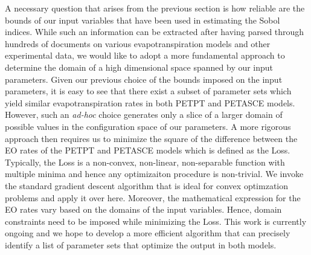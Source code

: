 \documentclass{article}
\begin{document}
A necessary question that arises from the previous section is how reliable are
the bounds of our input variables that have been used in estimating the Sobol
indices. While such an
information can be extracted after having parsed through hundreds of documents on
various evapotranspiration models and other experimental data, we would like to
adopt a more fundamental approach to determine the domain of a high
dimensional space spanned by our input
parameters. Given our previous choice of the bounds imposed on the input parameters, it is easy
to see that there exist a subset of parameter sets which yield similar
evapotranspiration rates in both PETPT and PETASCE models. However, such an
{\it ad-hoc} choice generates only a slice of a larger domain of possible values in
the configuration space of our parameters. A more rigorous approach then
requires us to minimize the square of the difference between the EO rates of the PETPT and
PETASCE models which is defined as the Loss. 
Typically, the Loss is a non-convex, non-linear, non-separable function with
multiple minima and hence any optimizaiton procedure is non-trivial. 
We invoke the standard gradient descent algorithm that is ideal for
convex optimzation problems and apply it over here. Moreover, the mathematical
expression for the EO rates vary based on the domains of the input variables.
Hence, domain constraints need to be imposed while minimizing the Loss.
This work is currently  ongoing and we hope to develop a more efficient
algorithm that can precisely identify a list of parameter sets that optimize
the output in both models. 
\end{document}
